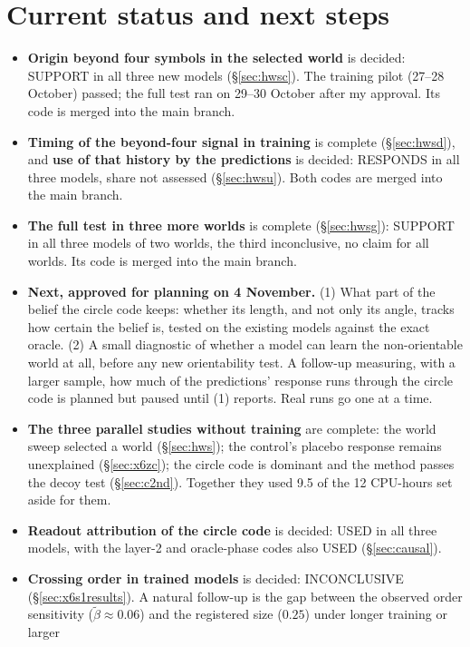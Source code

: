 \documentclass[11pt,a4paper]{article}
\DeclareRobustCommand{\_}{\ifmmode\origunderscore\else\textunderscore\allowbreak\fi}
\begin{document}
\section{Current status and next steps}\label{sec:status}
\begin{itemize}
\item \textbf{Origin beyond four symbols in the selected world} is decided: SUPPORT in all three
new models (\S\ref{sec:hwsc}). The training pilot (27--28 October) passed; the full test ran on
29--30 October after my approval. Its code is merged into the main branch.
\item \textbf{Timing of the beyond-four signal in training} is complete (\S\ref{sec:hwsd}), and
\textbf{use of that history by the predictions} is decided: RESPONDS in all three models, share
not assessed (\S\ref{sec:hwsu}). Both codes are merged into the main branch.
\item \textbf{The full test in three more worlds} is complete (\S\ref{sec:hwsg}): SUPPORT in all
three models of two worlds, the third inconclusive, no claim for all worlds. Its code is merged
into the main branch.
\item \textbf{Next, approved for planning on 4 November.} (1) What part of the belief the circle
code keeps: whether its length, and not only its angle, tracks how certain the belief is, tested
on the existing models against the exact oracle. (2) A small diagnostic of whether a model can
learn the non-orientable world at all, before any new orientability test. A follow-up measuring,
with a larger sample, how much of the predictions' response runs through the circle code is
planned but paused until (1) reports. Real runs go one at a time.
\item \textbf{The three parallel studies without training} are complete: the world sweep
selected a world (\S\ref{sec:hws}); the control's placebo response remains unexplained
(\S\ref{sec:x6zc}); the circle code is dominant and the method passes the decoy test
(\S\ref{sec:c2nd}). Together they used 9.5 of the 12 CPU-hours set aside for them.
\item \textbf{Readout attribution of the circle code} is decided: USED in all three models, with
the layer-2 and oracle-phase codes also USED (\S\ref{sec:causal}).
\item \textbf{Crossing order in trained models} is decided: INCONCLUSIVE
(\S\ref{sec:x6s1results}). A natural follow-up is the gap between the observed order sensitivity
($\tilde\beta\approx0.06$) and the registered size ($0.25$) under longer training or larger

\end{itemize}
\end{document}

